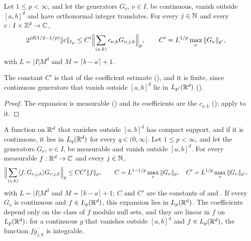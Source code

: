 \begin{theorem}
\label{thm:daub-rd-lower-stability}
\leanok
{}
Let $1 \leq p < \infty$, and let the generators $G_\nu$, $\nu \in I$, be continuous, vanish
outside $[a, b]^d$ and have orthonormal integer translates. For every $j \in \mathbb{N}$ and every
$c : I \times \mathbb{Z}^d \to \mathbb{C}$,
\[
  2^{jd(1/2 - 1/p)} \|c\|_{\ell_p}
  \leq C' \Bigl\|\sum_{(\nu, k)} c_{\nu,k} G_{\nu,j,k}\Bigr\|_p , \qquad
  C' = L^{1/p} \max_\nu \|G_\nu\|_{p'} ,
\]
with $L = |I| M^d$ and $M = \lceil b - a \rceil + 1$.
\end{theorem}

The constant $C'$ is that of the coefficient estimate (), and it
is finite, since continuous generators that vanish outside $[a, b]^d$ lie in $L_{p'}(\mathbb{R}^d)$
().

\begin{proof}
\leanok
{}
The expansion is measurable () and its coefficients are the
$c_{\nu,k}$ (); apply  to it.
\end{proof}

\begin{lemma}
\label{lem:daub-rd-expand-coeff}
\leanok
{}
A function on $\mathbb{R}^d$ that vanishes outside $[a, b]^d$ has compact support, and if it is
continuous, it lies in $L_q(\mathbb{R}^d)$ for every $q \in (0, \infty]$. Let $1 \leq p < \infty$, and let
the generators $G_\nu$, $\nu \in I$, be measurable and vanish outside $[a, b]^d$. For every
measurable $f : \mathbb{R}^d \to \mathbb{C}$ and every $j \in \mathbb{N}$,
\[
  \Bigl\|\sum_{(\nu, k)} \langle f, G_{\nu,j,k} \rangle G_{\nu,j,k}\Bigr\|_p
  \leq C C' \|f\|_p , \qquad
  C = L^{1 - 1/p} \max_\nu \|G_\nu\|_p , \quad C' = L^{1/p} \max_\nu \|G_\nu\|_{p'} ,
\]
with $L = |I| M^d$ and $M = \lceil b - a \rceil + 1$; $C$ and $C'$ are the constants of
 and . If every $G_\nu$ is
continuous and $f \in L_p(\mathbb{R}^d)$, this expansion lies in $L_p(\mathbb{R}^d)$. The coefficients depend
only on the class of $f$ modulo null sets, and they are linear in $f$ on $L_p(\mathbb{R}^d)$: for a
continuous $g$ that vanishes outside $[a, b]^d$ and $f \in L_p(\mathbb{R}^d)$, the function
$f \overline{g_{j,k}}$ is integrable.
\end{lemma}


